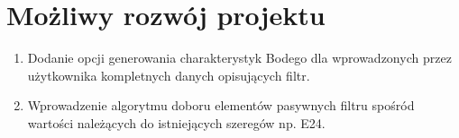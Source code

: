 \documentclass[a4paper,12pt]{article}
\begin{document}
\section{Możliwy rozwój projektu}

	\begin{enumerate}
		\item Dodanie opcji generowania charakterystyk Bodego dla wprowadzonych przez 
		użytkownika kompletnych danych opisujących filtr.
		\item Wprowadzenie algorytmu doboru elementów pasywnych filtru spośród wartości 
		należących do istniejących szeregów np. E24.
	\end{enumerate}
\end{document}
